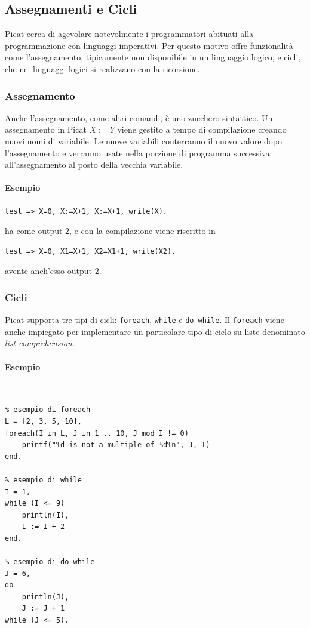 \documentclass[12pt,a4paper,openright]{book}  %
\begin{document}
\subsection{Assegnamenti e Cicli}
\label{subsec:picat_base_asscycle}

Picat cerca di agevolare notevolmente i programmatori abituati alla
programmazione con linguaggi imperativi. Per questo motivo offre
funzionalità come l'assegnamento, tipicamente non disponibile in un
linguaggio logico, e cicli, che nei linguaggi logici si realizzano con
la ricorsione.

\subsubsection{Assegnamento}

Anche l'assegnamento, come altri comandi, è uno zucchero
sintattico. Un assegnamento in Picat $X := Y$ viene gestito a tempo di
compilazione creando nuovi nomi di variabile. Le nuove variabili
conterranno il nuovo valore dopo l'assegnamento e verranno usate nella
porzione di programma successiva all'assegnamento al posto della
vecchia variabile.

\paragraph{Esempio}
\begin{verbatim}
test => X=0, X:=X+1, X:=X+1, write(X).
\end{verbatim}
ha come output $2$, e con la compilazione viene riscritto in
\begin{verbatim}
test => X=0, X1=X+1, X2=X1+1, write(X2).
\end{verbatim}
avente anch'esso output $2$.

\subsubsection{Cicli}

Picat supporta tre tipi di cicli: \verb|foreach|, \verb|while| e
\verb|do-while|. Il \verb|foreach| viene anche impiegato per
implementare un particolare tipo di ciclo su liste denominato
\emph{list comprehension}.

\paragraph{Esempio}\
\begin{lstlisting}
% esempio di foreach
L = [2, 3, 5, 10],
foreach(I in L, J in 1 .. 10, J mod I != 0)
	printf("%d is not a multiple of %d%n", J, I)
end.

% esempio di while
I = 1,
while (I <= 9)
	println(I),
	I := I + 2
end.

% esempio di do while
J = 6,
do
	println(J),
	J := J + 1
while (J <= 5).
\end{lstlisting}
\end{document}
